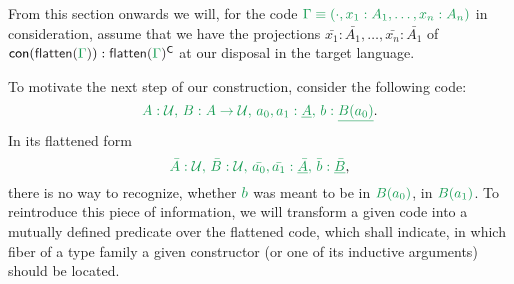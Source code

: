 \documentclass[12pt,headings=optiontohead,openany,oneside,a4paper]{book}
\theoremstyle{definition}
\newcommand{\UU}{\mathcal{U}}
\newcommand{\gr}[1]{{\color{ForestGreen}#1}}
\newcommand{\grm}[1]{\ensuremath{\gr{#1}}}
\newcommand{\blm}[1]{\ensuremath{{\color{Black}#1}}}
\newcommand{\CC}{\mathsf{C}}
\newcommand{\con}[1]{\mathsf{con}(\grm{#1})}
\newcommand{\flatten}[1]{\blm{\mathsf{flatten}(\grm{#1})}}
\begin{document}
From this section onwards we will, for the code $\grm{\Gamma \equiv (\cdot, x_1 : A_1, \ldots, x_n : A_n)}$
in consideration, assume that we have the projections $\bar{x_1} : \bar{A_1}, \ldots, \bar{x_n} : \bar{A_1}$ of
$\con{\grm{\flatten{\Gamma}}} : \grm{\flatten{\Gamma}}^\CC$ at our disposal in the target
language.

To motivate the next step of our construction, consider the following code:
\begin{equation*}
\grm{
A : \UU,\, B : A \to \UU,\, a_0, a_1 : \underline{A},\, b : \underline{B(a_0)}
} \text{.}
\end{equation*}
In its flattened form
\begin{equation*}
\grm{
\bar{A} : \UU,\, \bar{B} : \UU,\, \bar{a_0}, \bar{a_1} : \underline{\bar{A}},\, \bar{b} : \underline{\bar{B}}
} \text{,}
\end{equation*}
there is no way to recognize, whether \grm{b} was meant to be in \grm{B(a_0)},
in \grm{B(a_1)}.
To reintroduce this piece of information, we will transform a given code into a
mutually defined predicate over the flattened code, which shall indicate, in which
fiber of a type family a given constructor (or one of its inductive arguments)
should be located.
\end{document}
